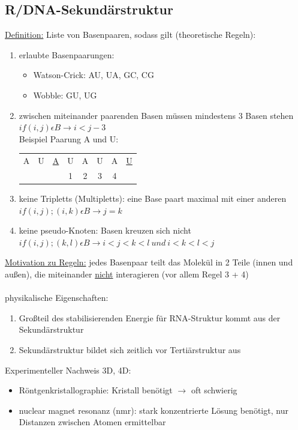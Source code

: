 \subsection{R/DNA-Sekundärstruktur}
\underline{Definition:} Liste von Basenpaaren, sodass gilt (theoretische Regeln):
\begin{enumerate}
	\item erlaubte Basenpaarungen:
	\begin{itemize}
		\item Watson-Crick: AU, UA, GC, CG 
		\item Wobble: GU, UG
	\end{itemize}
	\item zwischen miteinander paarenden Basen müssen mindestens 3 Basen stehen
	$if(i,j) \epsilon B \rightarrow i < j-3 $\\
	Beispiel Paarung A und U:
	\begin{tabular}{cccccccc}
  		A & U & \underline{A} & U & A & U & A & \underline{U}\\
  		  &   &   & 1 & 2 & 3 & 4 &  \\
 	\end{tabular}
	\item keine Tripletts (Multipletts): eine Base paart maximal mit einer anderen
	$if(i,j);(i,k) \epsilon B \rightarrow j=k $
	\item keine pseudo-Knoten: Basen kreuzen sich nicht
	$if(i,j);(k,l) \epsilon B \rightarrow i<j<k<l\ und\ i<k<l<j $
\end{enumerate}

\underline{Motivation zu Regeln:} jedes Basenpaar teilt das Molekül in 2 Teile (innen und außen), die miteinander \underline{nicht} interagieren (vor allem Regel 3 + 4)
\\\\
physikalische Eigenschaften:
\begin{enumerate}
	\item Großteil des stabilisierenden Energie für RNA-Struktur kommt aus der Sekundärstruktur
	\item Sekundärstruktur bildet sich zeitlich vor Tertiärstruktur aus
\end{enumerate}

Experimenteller Nachweis 3D, 4D:
\begin{itemize}
	\item Röntgenkristallographie: Kristall benötigt $\rightarrow$ oft schwierig
	\item nuclear magnet resonanz (nmr): stark konzentrierte Lösung benötigt, nur Distanzen zwischen Atomen ermittelbar
\end{itemize}

